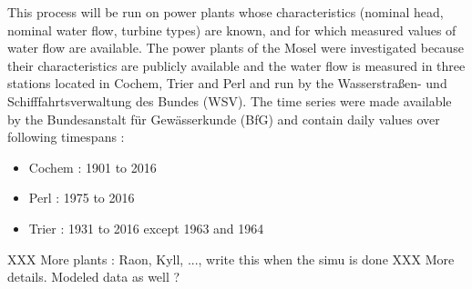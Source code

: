 This process will be run on power plants whose characteristics (nominal head, nominal water flow, turbine types) are known, and for which measured values of water flow are available. \newline
The power plants of the Mosel were investigated because their characteristics are publicly available \cite{mosel} and the water flow is measured in three stations located in Cochem, Trier and Perl and run by the Wasserstraßen- und Schifffahrtsverwaltung des Bundes (WSV). The time series were made available by the Bundesanstalt für Gewässerkunde (BfG) and contain daily values over following timespans :
\begin{itemize}
 \item Cochem \tabto{2cm}: 1901 to 2016
 \item Perl \tabto{2cm}: 1975 to 2016
 \item Trier \tabto{2cm}: 1931 to 2016 except 1963 and 1964
\end{itemize}
XXX More plants : Raon, Kyll, ..., write this when the simu is done
XXX More details. Modeled data as well ?

